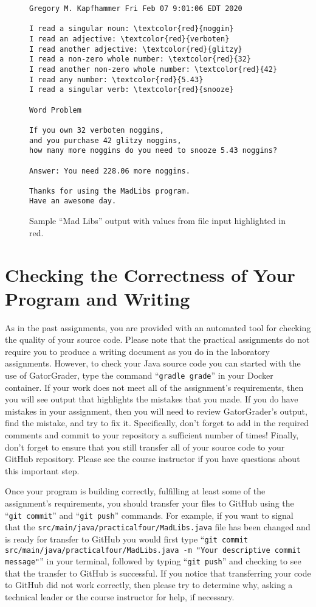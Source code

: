 \documentclass[11pt]{article}
\newcommand{\mainprogramsource}{\lstinline{src/main/java/practicalfour/MadLibs.java}}
\newcommand{\gatorgraderstart}{\command{gradle grade}}
\newcommand{\gitcommit}{\command{git commit}}
\newcommand{\gitpush}{\command{git push}}
\newcommand{\gitcommitmainprogram}{\command{git commit src/main/java/practicalfour/MadLibs.java -m "Your
descriptive commit message"}}
\newcommand{\command}[1]{``\lstinline{#1}''}
\begin{document}
\begin{figure}[tb]
\begin{Verbatim}[commandchars=\\\{\}]
Gregory M. Kapfhammer Fri Feb 07 9:01:06 EDT 2020

I read a singular noun: \textcolor{red}{noggin}
I read an adjective: \textcolor{red}{verboten}
I read another adjective: \textcolor{red}{glitzy}
I read a non-zero whole number: \textcolor{red}{32}
I read another non-zero whole number: \textcolor{red}{42}
I read any number: \textcolor{red}{5.43}
I read a singular verb: \textcolor{red}{snooze}

Word Problem

If you own 32 verboten noggins,
and you purchase 42 glitzy noggins,
how many more noggins do you need to snooze 5.43 noggins?

Answer: You need 228.06 more noggins.

Thanks for using the MadLibs program.
Have an awesome day.
\end{Verbatim}
\vspace*{-.1in}
\caption{Sample ``Mad Libs'' output with values from file input highlighted in red.}
\label{mad}
\end{figure}

\section*{Checking the Correctness of Your Program and Writing}

As in the past assignments, you are provided with an automated tool for checking
the quality of your source code. Please note that the practical assignments do
not require you to produce a writing document as you do in the laboratory
assignments. However, to check your Java source code you can started with the
use of GatorGrader, type the command \gatorgraderstart{} in your Docker
container. If your work does not meet all of the assignment's requirements, then
you will see output that highlights the mistakes that you made. If you do have
mistakes in your assignment, then you will need to review GatorGrader's output,
find the mistake, and try to fix it. Specifically, don't forget to add in the
required comments and commit to your repository a sufficient number of times!
Finally, don't forget to ensure that you still transfer all of your source code
to your GitHub repository. Please see the course instructor if you have
questions about this important step.

Once your program is building correctly, fulfilling at least some of the
assignment's requirements, you should transfer your files to GitHub using the
\gitcommit{} and \gitpush{} commands. For example, if you want to signal that
the \mainprogramsource{} file has been changed and is ready for transfer to
GitHub you would first type \gitcommitmainprogram{} in your terminal, followed
by typing \gitpush{} and checking to see that the transfer to GitHub is
successful. If you notice that transferring your code to GitHub did not work
correctly, then please try to determine why, asking a technical leader or the
course instructor for help, if necessary.
\end{document}
